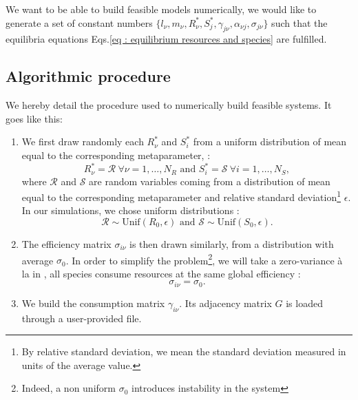 \documentclass[12pt, titlepage]{report}
\begin{document}
We want to be able to build feasible models numerically, \ie we would like to generate a set of constant numbers $\{
l_\nu, m_\nu, R^*_\nu, S^*_j, \gamma_{j\nu}, \alpha_{\nu j}, \sigma_{j\nu}\}$ such that the equilibria equations Eqs.\eqref{eq : equilibrium resources and species} are fulfilled.


\subsection{Algorithmic procedure}\label{sec : algorithmic procedure}
We hereby detail the procedure used to numerically build feasible systems. It goes like this:
\begin{enumerate}
  \item We first draw randomly each $R^*_\nu$
  and $S^*_i$ from a uniform distribution of mean equal to the corresponding metaparameter, \ie :
  \begin{equation}
     R^*_\nu = \mathcal{R} \ \forall \nu=1, \dots, N_R\text{ and }  S^*_i = \mathcal{S} \ \forall i=1, \dots, N_S,
  \end{equation}
  where $\mathcal{R}$ and $\mathcal{S}$ are random variables coming from a distribution of mean equal to the corresponding metaparameter and relative standard deviation\footnote{By relative standard deviation, we mean the standard deviation measured in units of the average value.} $\epsilon$. In our simulations, we chose uniform distributions :
  \begin{equation}
  \mathcal{R} \sim \text{Unif}(R_0, \epsilon) \text{ and } \mathcal{S} \sim \text{Unif}(S_0, \epsilon).
  \end{equation}
  \item The efficiency matrix $\sigma_{i\nu}$ is then drawn similarly, from a distribution with average $\sigma_0$. In order to simplify the problem\footnote{Indeed, a non uniform $\sigma_0$ introduces instability in the system}, we will take a zero-variance à la \citeauthor{butler_stability_2018} in \cite{butler_stability_2018}, \ie all species consume resources at the same global efficiency :
  \begin{equation}
    \sigma_{i\nu} = \sigma_0.
  \end{equation}
  \item We build the consumption matrix $\gamma_{i\nu}$. Its adjacency matrix $G$ is loaded through a user-provided file.

\end{enumerate}
\end{document}
